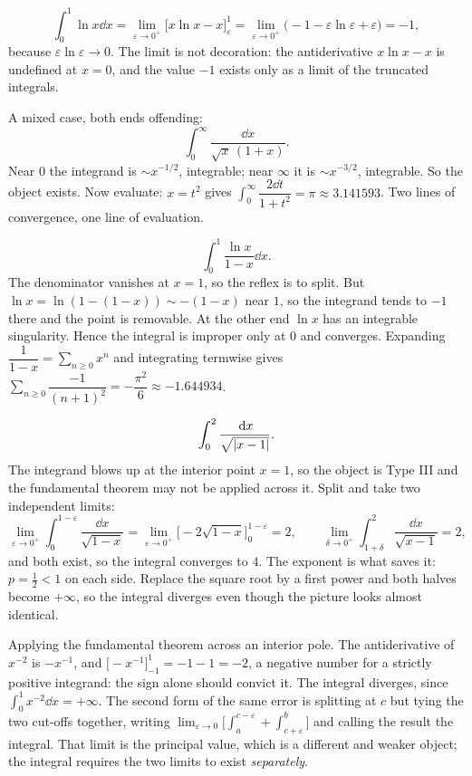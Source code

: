 \begin{worked}
\[\int_0^{1}\ln x\dd x=\lim_{\varepsilon\to0^{+}}\bigl[x\ln x-x\bigr]_{\varepsilon}^{1}=\lim_{\varepsilon\to0^{+}}\bigl(-1-\varepsilon\ln\varepsilon+\varepsilon\bigr)=-1,\]
because $\varepsilon\ln\varepsilon\to0$. The limit is not decoration: the antiderivative $x\ln x-x$ is undefined at $x=0$, and the value $-1$ exists only as a limit of the truncated integrals.

A mixed case, both ends offending:
\[\int_0^{\infty}\frac{\dd x}{\sqrt{x}\,(1+x)}.\]
Near $0$ the integrand is $\sim x^{-1/2}$, integrable; near $\infty$ it is $\sim x^{-3/2}$, integrable. So the object exists. Now evaluate: $x=t^{2}$ gives $\int_0^{\infty}\dfrac{2\dd t}{1+t^{2}}=\pi\approx3.141593$. Two lines of convergence, one line of evaluation.
\end{worked}

\begin{worked}
\[\int_0^{1}\frac{\ln x}{1-x}\dd x.\]
The denominator vanishes at $x=1$, so the reflex is to split. But $\ln x=\ln(1-(1-x))\sim-(1-x)$ near $1$, so the integrand tends to $-1$ there and the point is removable. At the other end $\ln x$ has an integrable singularity. Hence the integral is improper only at $0$ and converges. Expanding $\dfrac{1}{1-x}=\sum_{n\geq0}x^{n}$ and integrating termwise gives $\sum_{n\geq0}\dfrac{-1}{(n+1)^{2}}=-\dfrac{\pi^{2}}{6}\approx-1.644934$.
\end{worked}

\begin{worked}
\[\int_0^{2}\frac{\,\mathrm{d} x}{\sqrt{\left\lvert x-1\right\rvert}}.\]
The integrand blows up at the interior point $x=1$, so the object is Type III and the fundamental theorem may not be applied across it. Split and take two independent limits:
\[\lim_{\varepsilon\to0^{+}}\int_0^{1-\varepsilon}\frac{\dd x}{\sqrt{1-x}}=\lim_{\varepsilon\to0^{+}}\bigl[-2\sqrt{1-x}\bigr]_0^{1-\varepsilon}=2,\qquad \lim_{\delta\to0^{+}}\int_{1+\delta}^{2}\frac{\dd x}{\sqrt{x-1}}=2,\]
and both exist, so the integral converges to $4$. The exponent is what saves it: $p=\tfrac12<1$ on each side. Replace the square root by a first power and both halves become $+\infty$, so the integral diverges even though the picture looks almost identical.
\end{worked}

\begin{trap}
Applying the fundamental theorem across an interior pole. The antiderivative of $x^{-2}$ is $-x^{-1}$, and $\bigl[-x^{-1}\bigr]_{-1}^{1}=-1-1=-2$, a negative number for a strictly positive integrand: the sign alone should convict it. The integral diverges, since $\int_0^{1}x^{-2}\dd x=+\infty$. The second form of the same error is splitting at $c$ but tying the two cut-offs together, writing $\lim_{\varepsilon\to0}\bigl[\int_a^{c-\varepsilon}+\int_{c+\varepsilon}^{b}\bigr]$ and calling the result the integral. That limit is the principal value, which is a different and weaker object; the integral requires the two limits to exist \emph{separately}.
\end{trap}

